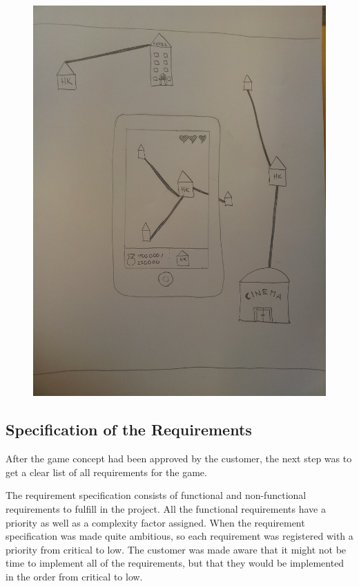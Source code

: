 \begin{figure}[H]
{			\includegraphics[scale=0.05]{pictures/gameConcept2}
		}
	\end{figure}

\subsection{Specification of the Requirements}
	After the game concept had been approved by the customer, the next step was to 
	get a clear list of all requirements for the game. 

	The requirement specification consists of functional and non-functional requirements to
	fulfill in the project. All the functional requirements have a priority as well as a 
	complexity factor assigned. When the requirement specification was made quite 
	ambitious, so each requirement was registered with a priority from critical to low. 
	The customer was made aware that it might not be time to implement all of the requirements, 
	but that they would be implemented in the order from critical to low. 

